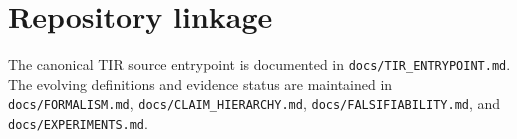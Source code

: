 \documentclass[11pt,a4paper]{book}
\begin{document}
\backmatter
\chapter*{Repository linkage}
The canonical TIR source entrypoint is documented in \texttt{docs/TIR\_ENTRYPOINT.md}. The evolving definitions and evidence status are maintained in \texttt{docs/FORMALISM.md}, \texttt{docs/CLAIM\_HIERARCHY.md}, \texttt{docs/FALSIFIABILITY.md}, and \texttt{docs/EXPERIMENTS.md}.
\end{document}
